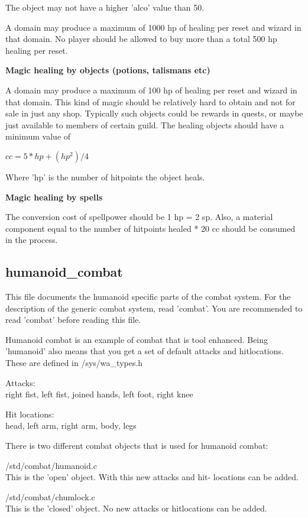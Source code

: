 The object may not have a higher 'alco' value than 50. 

A domain may produce a maximum of 1000 hp of healing per reset and
wizard in that domain. No player should be allowed to buy more than
a total 500 hp healing per reset.

{\bf Magic healing by objects (potions, talismans etc)}


A domain may produce a maximum of 100 hp of healing per reset and
wizard in that domain. This kind of magic should be relatively hard to
obtain and not for sale in just any shop. Typically such objects could
be rewards in quests, or maybe just available to members of certain
guild. The healing objects should have a minimum value of 

    $cc = 5 * hp + (hp ^ 2) / 4$

Where 'hp' is the number of hitpoints the object heals.

{\bf Magic healing by spells}


The conversion cost of spellpower should be 1 hp = 2 sp. Also, a 
material component equal to the number of hitpoints healed * 20 cc
should be consumed in the process.


\subsection{humanoid\_combat}

This file documents the humanoid specific parts of the combat system. For
the description of the generic combat system, read 'combat'. You are
recommended to read 'combat' before reading this file.

Humanoid combat is an example of combat that is tool enhanced. Being
'humanoid' also means that you get a set of default attacks and hitlocations.
These are defined in /sys/wa\_types.h

    Attacks: \\
        right fist, left fist, joined hands, left foot, right knee

    Hit locations: \\
        head, left arm, right arm, body, legs

There is two different combat objects that is used for humanoid combat:

    /std/combat/humanoid.c \\
        This is the 'open' object. With this new attacks and hit-
        locations can be added.

    /std/combat/chumlock.c \\
        This is the 'closed' object. No new attacks or hitlocations
        can be added.

